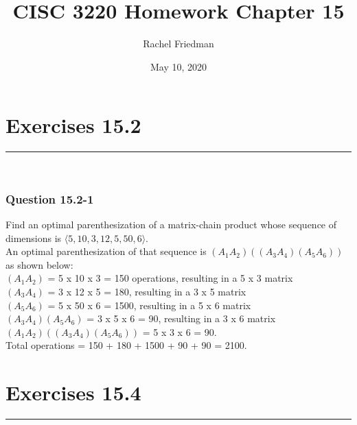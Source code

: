 \documentclass[11pt]{article}
\title{CISC 3220 Homework Chapter 15}
\author{Rachel Friedman}
\date{May 10, 2020}
\begin{document}
\maketitle

\section*{Exercises 15.2}\nointerlineskip
\noindent \rule{\linewidth}{0.01pt}\\

\subsubsection*{Question 15.2-1}\nointerlineskip
Find an optimal parenthesization of a matrix-chain product whose sequence of dimensions is $\langle 5, 10, 3, 12, 5, 50, 6 \rangle$.\\

An optimal parenthesization of that sequence is $(A_1 A_2)((A_3 A_4)(A_5 A_6))$ as shown below:\\

$(A_1 A_2)$ = 5 x 10 x 3 = 150 operations, resulting in a 5 x 3 matrix\\
\indent $(A_3 A_4)$ = 3 x 12 x 5 = 180, resulting in a 3 x 5 matrix\\
\indent $(A_5 A_6)$ = 5 x 50 x 6 = 1500, resulting in a 5 x 6 matrix\\
\indent $(A_3 A_4)(A_5 A_6)$ = 3 x 5 x 6 = 90, resulting in a 3 x 6 matrix\\
\indent $(A_1 A_2)  ((A_3 A_4)(A_5 A_6))$ = 5 x 3 x 6 = 90.\\

Total operations = 150 + 180 + 1500 + 90 + 90 = 2100.\\

\section*{Exercises 15.4}\nointerlineskip
\noindent \rule{\linewidth}{0.01pt}\\
\end{document}
